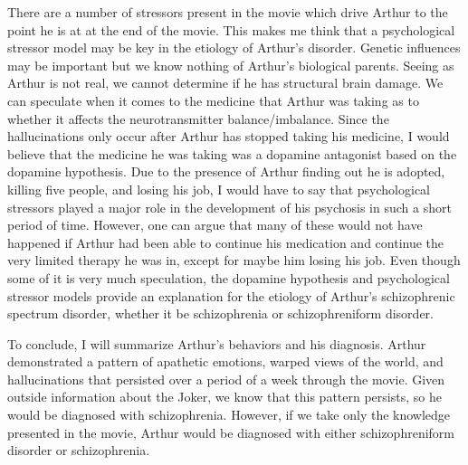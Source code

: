 \documentclass[12pt]{article}
\begin{document}
There are a number of stressors present in the movie which drive Arthur to the point he is at at the end of the movie. This makes me think that a psychological stressor model may be key in the etiology of Arthur's disorder. Genetic influences may be important but we know nothing of Arthur's biological parents. Seeing as Arthur is not real, we cannot determine if he has structural brain damage. We can speculate when it comes to the medicine that Arthur was taking as to whether it affects the neurotransmitter balance/imbalance. Since the hallucinations only occur after Arthur has stopped taking his medicine, I would believe that the medicine he was taking was a dopamine antagonist based on the dopamine hypothesis. Due to the presence of Arthur finding out he is adopted, killing five people, and losing his job, I would have to say that psychological stressors played a major role in the development of his psychosis in such a short period of time. However, one can argue that many of these would not have happened if Arthur had been able to continue his medication and continue the very limited therapy he was in, except for maybe him losing his job. Even though some of it is very much speculation, the dopamine hypothesis and psychological stressor models provide an explanation for the etiology of Arthur's schizophrenic spectrum disorder, whether it be schizophrenia or schizophreniform disorder.
\par
To conclude, I will summarize Arthur's behaviors and his diagnosis. Arthur demonstrated a pattern of apathetic emotions, warped views of the world, and hallucinations that persisted over a period of a week through the movie. Given outside information about the Joker, we know that this pattern persists, so he would be diagnosed with schizophrenia. However, if we take only the knowledge presented in the movie, Arthur would be diagnosed with either schizophreniform disorder or schizophrenia. 
\end{document}
